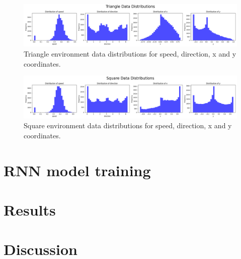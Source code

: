 \documentclass{article}
\begin{document}
\begin{figure}
    \centering
    \includegraphics[width=\textwidth]{figures/triangle_data_distribution.png}
    \caption{Triangle environment data distributions for speed, direction, x and y coordinates.}
    \label{fig:triangle_data_distribution}
\end{figure}

\begin{figure}
    \centering
    \includegraphics[width=\textwidth]{figures/square_data_distribution.png}
    \caption{Square environment data distributions for speed, direction, x and y coordinates.}
    \label{fig:square_data_distribution}
\end{figure}


\section{RNN model training}


\section{Results}

\section{Discussion}





\end{document}
